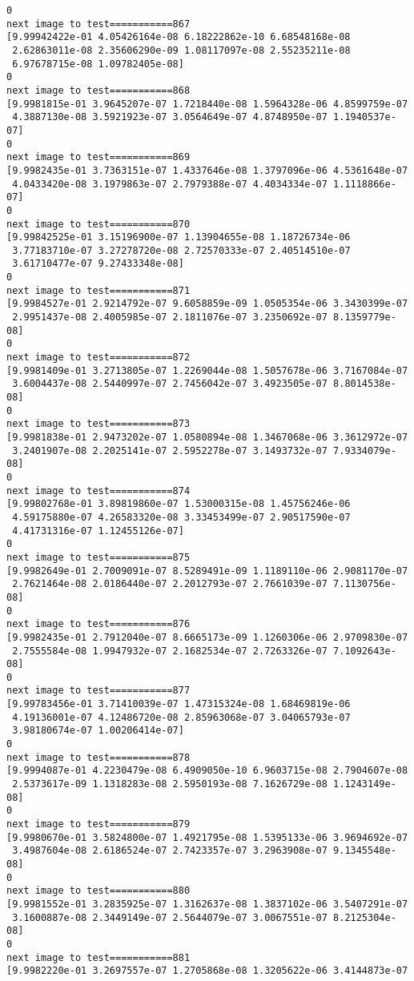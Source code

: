 \documentclass[11pt]{article}
\begin{document}
\begin{Verbatim}[commandchars=\\\{\}]
0
next image to test===========867
[9.99942422e-01 4.05426164e-08 6.18222862e-10 6.68548168e-08
 2.62863011e-08 2.35606290e-09 1.08117097e-08 2.55235211e-08
 6.97678715e-08 1.09782405e-08]
0
next image to test===========868
[9.9981815e-01 3.9645207e-07 1.7218440e-08 1.5964328e-06 4.8599759e-07
 4.3887130e-08 3.5921923e-07 3.0564649e-07 4.8748950e-07 1.1940537e-07]
0
next image to test===========869
[9.9982435e-01 3.7363151e-07 1.4337646e-08 1.3797096e-06 4.5361648e-07
 4.0433420e-08 3.1979863e-07 2.7979388e-07 4.4034334e-07 1.1118866e-07]
0
next image to test===========870
[9.99842525e-01 3.15196900e-07 1.13904655e-08 1.18726734e-06
 3.77183710e-07 3.27278720e-08 2.72570333e-07 2.40514510e-07
 3.61710477e-07 9.27433348e-08]
0
next image to test===========871
[9.9984527e-01 2.9214792e-07 9.6058859e-09 1.0505354e-06 3.3430399e-07
 2.9951437e-08 2.4005985e-07 2.1811076e-07 3.2350692e-07 8.1359779e-08]
0
next image to test===========872
[9.9981409e-01 3.2713805e-07 1.2269044e-08 1.5057678e-06 3.7167084e-07
 3.6004437e-08 2.5440997e-07 2.7456042e-07 3.4923505e-07 8.8014538e-08]
0
next image to test===========873
[9.9981838e-01 2.9473202e-07 1.0580894e-08 1.3467068e-06 3.3612972e-07
 3.2401907e-08 2.2025141e-07 2.5952278e-07 3.1493732e-07 7.9334079e-08]
0
next image to test===========874
[9.99802768e-01 3.89819860e-07 1.53000315e-08 1.45756246e-06
 4.59175880e-07 4.26583320e-08 3.33453499e-07 2.90517590e-07
 4.41731316e-07 1.12455126e-07]
0
next image to test===========875
[9.9982649e-01 2.7009091e-07 8.5289491e-09 1.1189110e-06 2.9081170e-07
 2.7621464e-08 2.0186440e-07 2.2012793e-07 2.7661039e-07 7.1130756e-08]
0
next image to test===========876
[9.9982435e-01 2.7912040e-07 8.6665173e-09 1.1260306e-06 2.9709830e-07
 2.7555584e-08 1.9947932e-07 2.1682534e-07 2.7263326e-07 7.1092643e-08]
0
next image to test===========877
[9.99783456e-01 3.71410039e-07 1.47315324e-08 1.68469819e-06
 4.19136001e-07 4.12486720e-08 2.85963068e-07 3.04065793e-07
 3.98180674e-07 1.00206414e-07]
0
next image to test===========878
[9.9994087e-01 4.2230479e-08 6.4909050e-10 6.9603715e-08 2.7904607e-08
 2.5373617e-09 1.1318283e-08 2.5950193e-08 7.1626729e-08 1.1243149e-08]
0
next image to test===========879
[9.9980670e-01 3.5824800e-07 1.4921795e-08 1.5395133e-06 3.9694692e-07
 3.4987604e-08 2.6186524e-07 2.7423357e-07 3.2963908e-07 9.1345548e-08]
0
next image to test===========880
[9.9981552e-01 3.2835925e-07 1.3162637e-08 1.3837102e-06 3.5407291e-07
 3.1600887e-08 2.3449149e-07 2.5644079e-07 3.0067551e-07 8.2125304e-08]
0
next image to test===========881
[9.9982220e-01 3.2697557e-07 1.2705868e-08 1.3205622e-06 3.4144873e-07

\end{Verbatim}
\end{document}
